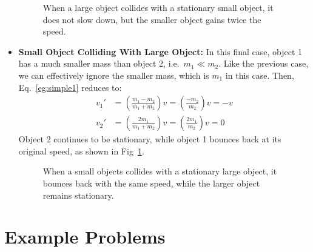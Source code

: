 \begin{itemize}[leftmargin=15pt]
\begin{figure}[ht]
    \caption{When a large object collides with a stationary small object, 
    it does not slow down, but the smaller object gains twice the speed.}
    \label{fig:big-small}
  \end{figure}
\item\textbf{Small Object Colliding With Large Object:} In this final case,
  object 1 has a much smaller mass than object 2, i.e.\ $m_1\ll m_2$. Like the
  previous case, we can effectively ignore the smaller mass, which is $m_1$ in
  this case. Then, Eq.~\ref{eg:simple1} reduces to:
  \begin{align*}
    v_1'&=\left(\frac{m_1-m_2}{m_1+m_2}\right)v=\left(\frac{-m_2}{m_2}\right)v
    =-v\\
    v_2'&=\left(\frac{2m_1}{m_1+m_2}\right)v=\left(\frac{2m_1}{m_2}\right)v=0
  \end{align*}
  Object 2 continues to be stationary, while object 1 bounces back at its
  original speed, as shown in Fig~\ref{fig:big-small}.
  \begin{figure}[ht]
    \centering
    \caption{When a small objects collides with a stationary large object, it
      bounces back with the same speed, while the larger object remains
      stationary.}
  \end{figure}
\end{itemize}




\section{Example Problems}


